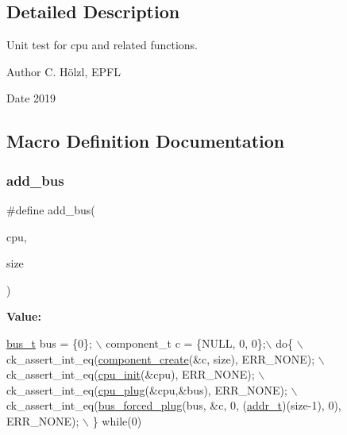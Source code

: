 \subsection{Detailed Description}
Unit test for cpu and related functions. 

\begin{DoxyAuthor}{Author}
C. Hölzl, E\+P\+FL 
\end{DoxyAuthor}
\begin{DoxyDate}{Date}
2019 
\end{DoxyDate}


\subsection{Macro Definition Documentation}
\mbox{\label{unit-test-cpu_8c_a3495385952727508217759f285c809e8}} 
\subsubsection{\texorpdfstring{add\+\_\+bus}{add\_bus}}
{\footnotesize\ttfamily \#define add\+\_\+bus(\begin{DoxyParamCaption}\item[{}]{cpu,  }\item[{}]{size }\end{DoxyParamCaption})}

{\bfseries Value\+:}
\begin{DoxyCode}
\hyperlink{bus_8h_a68c80bdf896e826e4cb082244ce35427}{bus\_t} bus = \{0\}; \(\backslash\)
    component\_t c = \{NULL, 0, 0\};\(\backslash\)
    do\{ \(\backslash\)
        ck\_assert\_int\_eq(\hyperlink{component_8h_a7774f00e205f6d588602d6e9dcda417a}{component\_create}(&c, size), ERR\_NONE);         \(\backslash\)
        ck\_assert\_int\_eq(\hyperlink{cpu_8c_a7449e22f2f4ab77db550aff8db36f3df}{cpu\_init}(&cpu), ERR\_NONE);                     \(\backslash\)
        ck\_assert\_int\_eq(\hyperlink{cpu_8c_a6410926983c64b5a2b2f99782f4e9e12}{cpu\_plug}(&cpu,&bus), ERR\_NONE);                \(\backslash\)
        ck\_assert\_int\_eq(\hyperlink{bus_8h_a386edaf5382cf5876c99c7ce85cca05b}{bus\_forced\_plug}(bus, &c, 0, (\hyperlink{memory_8h_a8a6444037e4d5cc2bf8ba22a9d9e33ca}{addr\_t})(size-1), 0), ERR\_NONE); 
      \(\backslash\)
    \} \textcolor{keywordflow}{while}(0)
\end{DoxyCode}
\mbox{\label{unit-test-cpu_8c_ad47d222fb0d5b1f2bae81af44d5f4456}} 
